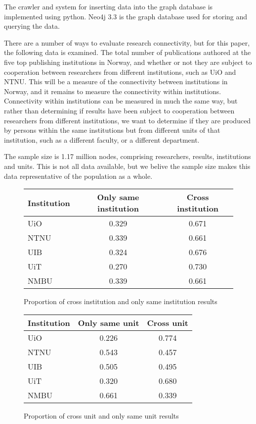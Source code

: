 The crawler and system for inserting data into the graph database is implemented using python.
Neo4j 3.3 is the graph database used for storing and querying the data.


There are a number of ways to evaluate research connectivity, but for this paper, the following data is examined.
The total number of publications authored at the five top publishing institutions in Norway, and whether or not they are subject to cooperation between researchers from different institutions, such as UiO and NTNU.
This will be a measure of the connectivity between institutions in Norway, and it remains to measure the connectivity within institutions.
Connectivity within institutions can be measured in much the same way, but rather than determining if results have been subject to cooperation between researchers from different institutions, we want to determine if they are produced by persons within the same institutions but from different units of that institution, such as a different faculty, or a different department.

The sample size is 1.17 million nodes, comprising researchers, results, institutions and units. This is not all data available, but we belive the sample size makes this data representative of the population as a whole.

\begin{figure}[h]
	\centering
	\begin{tabular}{| l || c | c |}
		\hline
		Institution	& Only same institution	& Cross institution	\\ \hline
		UiO		& 0.329			& 0.671			\\
		NTNU		& 0.339			& 0.661			\\
		UIB		& 0.324			& 0.676			\\
		UiT		& 0.270			& 0.730			\\
		NMBU		& 0.339			& 0.661			\\
		\hline
	\end{tabular}
	\caption{Proportion of cross institution and only same institution results}
	\label{tab:institution-proportion}
\end{figure}

\begin{figure}[h]
	\centering
	\begin{tabular}{| l || c | c |}
		\hline
		Institution	& Only same unit	& Cross unit	\\ \hline
		UiO		& 0.226			& 0.774		\\
		NTNU		& 0.543			& 0.457		\\
		UIB		& 0.505			& 0.495		\\
		UiT		& 0.320			& 0.680		\\
		NMBU		& 0.661			& 0.339		\\
		\hline
	\end{tabular}
	\caption{Proportion of cross unit and only same unit results}
	\label{tab:unit-proportion}
\end{figure}
